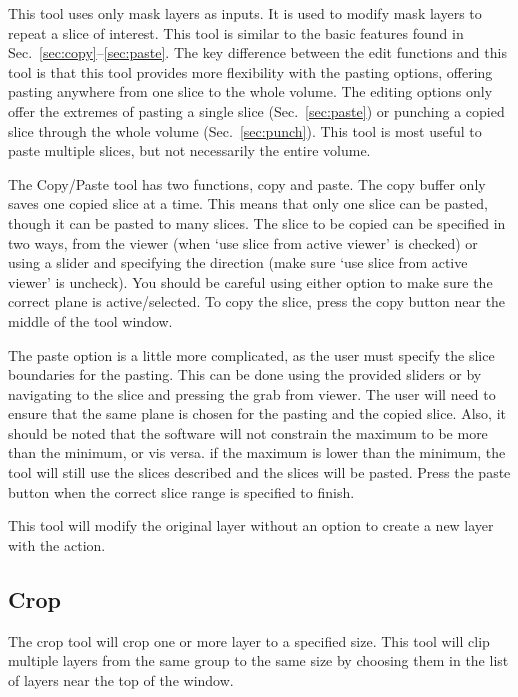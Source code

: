 \documentclass[fleqn,11pt,openany]{book}
\begin{document}
This tool uses only mask layers as inputs.  It is used to modify mask layers to repeat a slice of interest.  This tool is similar to the basic features found in Sec.~\ref{sec:copy}--\ref{sec:paste}.  The key difference between the edit functions and this tool is that this tool provides more flexibility with the pasting options, offering pasting anywhere from one slice to the whole volume.  The editing options only offer the extremes of pasting a single slice (Sec.~\ref{sec:paste}) or punching a copied slice through the whole volume (Sec.~\ref{sec:punch}).  This tool is most useful to paste multiple slices, but not necessarily the entire volume.  

The Copy/Paste tool has two functions, copy and paste.  The copy buffer only saves one copied slice at a time.  This means that only one slice can be pasted, though it can be pasted to many slices.  The slice to be copied can be specified in two ways, from the viewer (when `use slice from active viewer' is checked) or using a slider and specifying the direction (make sure `use slice from active viewer' is uncheck).  You should be careful using either option to make sure the correct plane is active/selected.  To copy the slice, press the copy button near the middle of the tool window.  

The paste option is a little more complicated, as the user must specify the slice boundaries for the pasting.  This can be done using the provided sliders or by navigating to the slice and pressing the grab from viewer.  The user will need to ensure that the same plane is chosen for the pasting and the copied slice.  Also, it should be noted that the software will not constrain the maximum to be more than the minimum, or vis versa.  if the maximum is lower than the minimum, the tool will still use the slices described and the slices will be pasted.  Press the paste button when the correct slice range is specified to finish.  

This tool will modify the original layer without an option to create a new layer with the action.  

\subsection{Crop}

The crop tool will crop one or more layer to a specified size.  This tool will clip multiple layers from the same group to the same size  by choosing them in the list of layers near the top of the window.  
\end{document}
